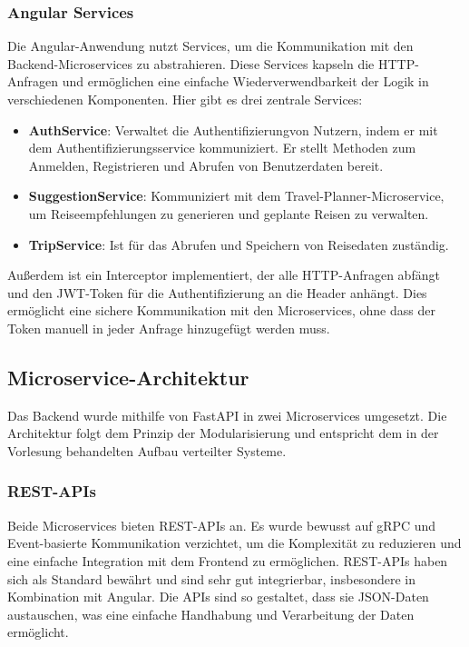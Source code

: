 \subsubsection{Angular Services}

Die Angular-Anwendung nutzt Services, um die Kommunikation mit den Backend-Microservices zu abstrahieren. Diese Services kapseln die HTTP-Anfragen und ermöglichen eine einfache Wiederverwendbarkeit der Logik in verschiedenen Komponenten.
Hier gibt es drei zentrale Services:

\begin{itemize}
  \item \textbf{AuthService}: Verwaltet die Authentifizierungvon Nutzern, indem er mit dem Authentifizierungsservice kommuniziert. Er stellt Methoden zum Anmelden, Registrieren und Abrufen von Benutzerdaten bereit.
  \item \textbf{SuggestionService}: Kommuniziert mit dem Travel-Planner-Microservice, um Reiseempfehlungen zu generieren und geplante Reisen zu verwalten.
  \item \textbf{TripService}: Ist für das Abrufen und Speichern von Reisedaten zuständig.
\end{itemize}

Außerdem ist ein Interceptor implementiert, der alle HTTP-Anfragen abfängt und den JWT-Token für die Authentifizierung an die Header anhängt. Dies ermöglicht eine sichere Kommunikation mit den Microservices, ohne dass der Token manuell in jeder Anfrage hinzugefügt werden muss.


\subsection{Microservice-Architektur}

Das Backend wurde mithilfe von FastAPI in zwei Microservices umgesetzt. Die Architektur folgt dem Prinzip der Modularisierung und entspricht dem in der Vorlesung behandelten Aufbau verteilter Systeme.

\subsubsection{REST-APIs}

Beide Microservices bieten REST-APIs an. Es wurde bewusst auf gRPC und Event-basierte Kommunikation verzichtet, um die Komplexität zu reduzieren und eine einfache Integration mit dem Frontend zu ermöglichen. REST-APIs haben sich als Standard bewährt und sind sehr gut integrierbar, insbesondere in Kombination mit Angular. Die APIs sind so gestaltet, dass sie JSON-Daten austauschen, was eine einfache Handhabung und Verarbeitung der Daten ermöglicht.

